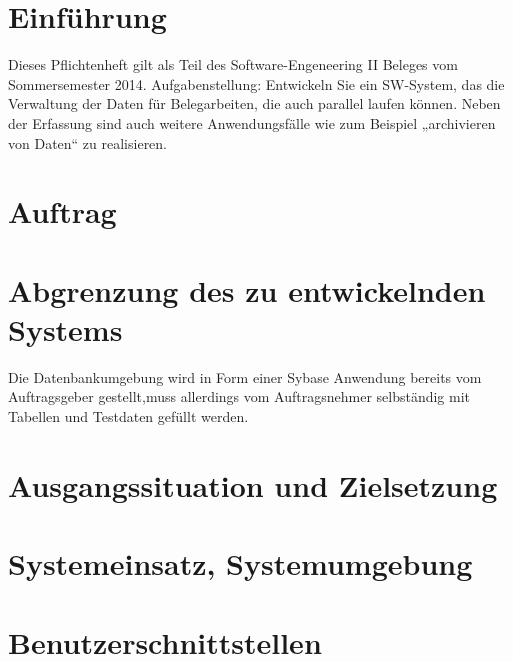 \part{Einführung} 

Dieses Pflichtenheft gilt als Teil des Software-Engeneering II Beleges vom Sommersemester 2014.
Aufgabenstellung:
Entwickeln  Sie ein SW-System, das die Verwaltung der Daten für Belegarbeiten, die auch parallel laufen können. Neben der Erfassung sind auch weitere Anwendungsfälle wie zum Beispiel „archivieren von Daten“ zu realisieren.


\part{Auftrag}


\part{Abgrenzung des zu entwickelnden Systems}
Die Datenbankumgebung wird in Form einer Sybase Anwendung bereits vom Auftragsgeber gestellt,muss allerdings vom Auftragsnehmer selbständig mit Tabellen und Testdaten gefüllt werden.
 
\part{Ausgangssituation und Zielsetzung}


\part{Systemeinsatz, Systemumgebung}


\part{Benutzerschnittstellen}


